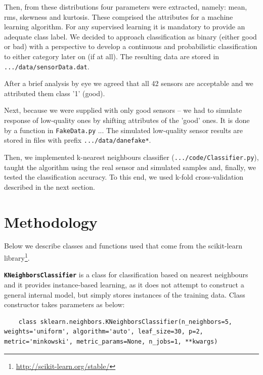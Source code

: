 \documentclass[a4paper,10pt]{article}
\begin{document}
Then, from these distributions four parameters were extracted, namely: mean, rms, skewness and kurtosis. These comprised the attributes for a machine learning algorithm. For any supervised learning it is mandatory to provide an adequate class label. We decided to approach classification as binary (either good or bad) with a perspective to develop a continuous and probabilistic classification to either category later on (if at all).
The resulting data are stored in \texttt{.../data/sensorData.dat}.


After a brief analysis by eye we agreed that all 42 sensors are acceptable and we attributed them class '1' (good).


Next, because we were supplied with only good sensors -- we had to simulate response of low-quality ones by shifting attributes of the 'good' ones. It is done by a function in \texttt{FakeData.py} ...
The simulated low-quality sensor results are stored in files with prefix \texttt{.../data/danefake*}.

Then, we implemented k-nearest neighbours classifier (\texttt{.../code/Classifier.py}), taught the algorithm using the real sensor and simulated samples and, finally, we tested the classification accuracy. To this end, we used k-fold cross-validation described in the next section.





\section{Methodology}
Below we describe classes and functions used that come from the scikit-learn library\footnote{\url{http://scikit-learn.org/stable/}}.

\textbf{\texttt{KNeighborsClassifier}} is a class for classification based on nearest neighbours and it provides instance-based learning, as it does not attempt to construct
a general internal model, but simply stores instances of the training data. Class constructor takes parameters as below:
\begin{lstlisting}
	class sklearn.neighbors.KNeighborsClassifier(n_neighbors=5, weights='uniform', algorithm='auto', leaf_size=30, p=2, metric='minkowski', metric_params=None, n_jobs=1, **kwargs)
\end{lstlisting}
\end{document}
